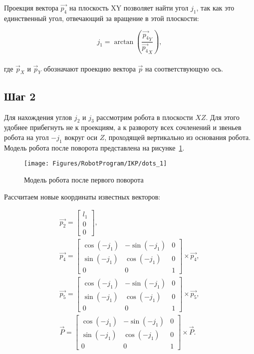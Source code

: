 Проекция вектора $\overrightarrow{p_4}$ на плоскость XY позволяет найти угол $j_1$, так как это единственный угол, отвечающий за вращение в этой плоскости:

\begin{equation*}
    j_1 = \arctan \left( \dfrac{\overrightarrow{p_4}_Y}{\overrightarrow{p_4}_X} \right),
\end{equation*} \\
где $\overrightarrow{p}_X$ и $\overrightarrow{p}_Y$ обозначают проекцию вектора $\overrightarrow{p}$ на соответствующую ось.

\subsection*{Шаг 2}
Для нахождения углов $j_2$ и $j_3$ рассмотрим робота в плоскости $XZ$.
Для этого удобнее прибегнуть не к проекциям, а к развороту всех сочленений и звеньев робота на угол $-j_1$ вокруг оси $Z$, проходящей вертикально из основания робота.
Модель робота после поворота представлена на рисунке~\ref{fig:RobotProgram:IKP:dots_1}.

\begin{figure}[H]
    \centering
    \vspace{14pt}
    \texttt{[image: Figures/RobotProgram/IKP/dots\_1]}
    \caption{Модель робота после первого поворота}
    \label{fig:RobotProgram:IKP:dots_1}
\end{figure}

Рассчитаем новые координаты известных векторов:

\begin{gather*}
    \overrightarrow{p_2} =
    \begin{bmatrix}
        l_1 \\
        0   \\
        0
    \end{bmatrix}, \\
    \overrightarrow{p_4} =
    \begin{bmatrix}
        \cos(-j_1) & -\sin(-j_1) & 0 \\
        \sin(-j_1) & \cos(-j_1)  & 0 \\
        0          & 0           & 1
    \end{bmatrix} \times \overrightarrow{p_4}, \\
    \overrightarrow{p_5} =
    \begin{bmatrix}
        \cos(-j_1) & -\sin(-j_1) & 0 \\
        \sin(-j_1) & \cos(-j_1)  & 0 \\
        0          & 0           & 1
    \end{bmatrix} \times \overrightarrow{p_5}, \\
    \overrightarrow{P} =
    \begin{bmatrix}
        \cos(-j_1) & -\sin(-j_1) & 0 \\
        \sin(-j_1) & \cos(-j_1)  & 0 \\
        0          & 0           & 1
    \end{bmatrix} \times \overrightarrow{P}.
\end{gather*} \\

